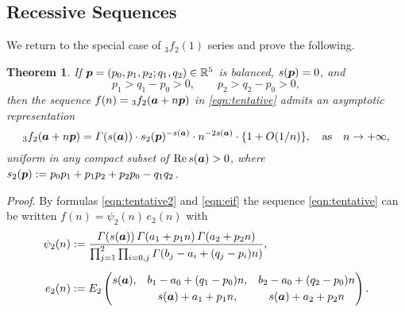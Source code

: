 \documentclass[a4paper,12pt]{article}
\theoremstyle{plain}
\newtheorem{theorem}{Theorem}[section]
\def\rRe{\mathrm{Re}}
\def\R{\mathbb{R}}
\def\vG{\varGamma}
\def\ba{\mbox{\boldmath $a$}}
\def\sba{\mbox{\boldmath ${\scriptstyle a}$}}
\def\bp{\mbox{\boldmath $p$}}
\begin{document}
\subsection{Recessive Sequences} \label{subsec:rs} 
We return to the special case of ${}_3f_2(1)$ series and prove the following.   
\begin{theorem} \label{thm:rs} 
If $\bp = (p_0,p_1,p_2;q_1,q_2) \in \R^5$ is balanced, $s(\bp) = 0$, and 
\begin{equation} \label{eqn:rs-a}
p_1 > q_1 - p_0 > 0, \qquad  p_2 > q_2 - p_0 > 0, 
\end{equation}
then the sequence $f(n) = {}_3f_2(\ba + n \bp)$ in \eqref{eqn:tentative} admits 
an asymptotic representation  
\begin{equation} \label{eqn:f(n)-asym}
{}_3f_2(\ba + n \bp) = 
\vG(s(\ba)) \cdot s_2(\bp)^{-s(\sba)} \cdot n^{-2 s(\sba)} \cdot \{ 1+O(1/n) \},  
\quad \mbox{as} \quad n \to + \infty, 
\end{equation}
uniform in any compact subset of $\rRe \, s(\ba) > 0$, 
where $s_2(\bp) := p_0 p_1 + p_1p_2 + p_2 p_0 -q_1 q_2$.  
\end{theorem} 
{\it Proof}. 
By formulas \eqref{eqn:tentative2} and \eqref{eqn:eif} the sequence 
\eqref{eqn:tentative} can be written $f(n) = \psi_2(n) \, e_2(n)$ with  
\begin{subequations} \label{eqn:psi2e2}
\begin{align}
\psi_2(n) &:=  
\dfrac{\vG( s(\ba) ) \, \vG( a_1 + p_1 n ) \,  
\vG( a_2 + p_2 n )}{ \prod_{j=1}^2 \prod_{i=0, j} \vG( b_j-a_i+(q_j-p_i) n ) }, 
\label{eqn:psi2}
\\[2mm]
e_2(n) &:=  
E_2\begin{pmatrix}
s(\ba), & b_1 - a_0 + (q_1 - p_0) n, & b_2 - a_0 + (q_2 - p_0) n \\[1mm] 
   & s(\ba) + a_1 + p_1 n,              & s(\ba) + a_2 + p_2 n 
\end{pmatrix}.  \label{eqn:e2}
\end{align} 
\end{subequations}
\end{document}
